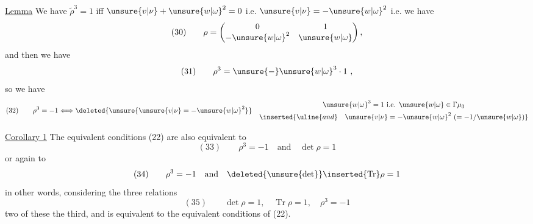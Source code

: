 \uline{Lemma} We have $\widetilde\rho^3=1$ iff $\unsure{v|\nu}+\unsure{w|\omega}^2=0$ i.e. $\unsure{v|\nu}=-\unsure{w|\omega}^2$ i.e. we have
\[
(30)\qquad
\rho=\begin{pmatrix}0&1\\-\unsure{w|\omega}^2&\unsure{w|\omega}\end{pmatrix},
\]
and then we have
\[
(31)\qquad \rho^3=\unsure{-}\unsure{w|\omega}^3\cdot1\ ,
\]
so we have
\[
(32)\qquad
\rho^3=-1\Longleftrightarrow
\deleted{\unsure{\unsure{v|\nu}=-\unsure{w|\omega}^2}}\quad
\begin{gathered}
\unsure{w|\omega}^3=1\ \text{i.e. }\unsure{w|\omega}\in\Gamma\mu_3\\
\inserted{\uline{and}\quad \unsure{v|\nu}=-\unsure{w|\omega}^2\ (= -1/\unsure{w|\omega})}
\end{gathered}
\]



\uline{Corollary 1} The equivalent conditions (22) are also equivalent to
\[
(33)\qquad \rho^3=-1\quad\text{and}\quad\det\rho=1
\]
or again to
\[
(34)\qquad \rho^3=-1\quad\text{and}\quad\deleted{\unsure{\det}}\inserted{\operatorname{Tr}}\rho=1
\]
in other words, considering the three relations
\[
(35)\qquad \det\rho=1,\quad\operatorname{Tr}\rho=1,\quad\rho^3=-1
\]
 two of these  the third, and is equivalent to the equivalent conditions of (22).





